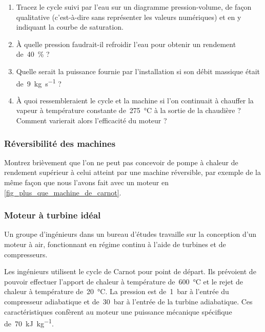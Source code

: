 	\begin{enumerate}
	
		\item Tracez le cycle suivi par l’eau sur un diagramme pression-volume, de façon qualitative (c’est-à-dire sans représenter les valeurs numériques) et en y indiquant la courbe de saturation.
		
		\item À quelle pression faudrait-il refroidir l’eau pour obtenir un rendement de~\SI{40}{\percent} ?
		
		\item Quelle serait la puissance fournie par l’installation si son débit massique était de~\SI{9}{\kilogram\per\second} ?
		
		\item À quoi ressembleraient le cycle et la machine si l’on continuait à chauffer la vapeur à température constante de~\SI{275}{\degreeCelsius} à la sortie de la chaudière ? Comment varierait alors l’efficacité du moteur ?
		
	\end{enumerate}


\subsubsection{Réversibilité des machines}
\label{exo_thermopompe_plusplus}

	Montrez brièvement que l’on ne peut pas concevoir de pompe à chaleur de rendement supérieur à celui atteint par une machine réversible, par exemple de la même façon que nous l’avons fait avec un moteur en \cref{fig_plus_que_machine_de_carnot}.


\subsubsection{Moteur à turbine idéal}
\label{exo_moteur_turbine_ideal}
\wherefrom{[DS n°2 2012, 11pts]}

	Un groupe d’ingénieurs dans un bureau d’études travaille sur la conception d’un moteur à air, fonctionnant en régime continu à l’aide de turbines et de compresseurs.

	Les ingénieurs utilisent le cycle de Carnot pour point de départ. Ils prévoient de pouvoir effectuer l’apport de chaleur à température de~\SI{600}{\degreeCelsius} et le rejet de chaleur à température de~\SI{20}{\degreeCelsius}. La pression est de~\SI{1}{\bar} à l’entrée du compresseur adiabatique et de~\SI{30}{\bar} à l’entrée de la turbine adiabatique. Ces caractéristiques confèrent au moteur une puissance mécanique spécifique de~\SI{70}{\kilo\joule\per\kilogram}.


